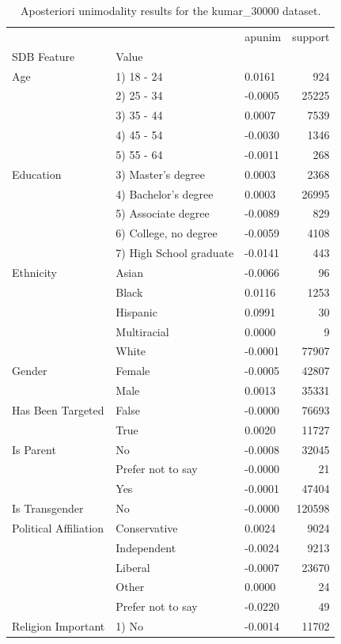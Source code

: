 \begin{table}[ht]\centering
\caption{Aposteriori unimodality results for the kumar_30000 dataset.}
\label{tab:kumar_30000}
\begin{tabular}{lllr}
\toprule
 &  & apunim & support \\
SDB Feature & Value &  &  \\
\midrule
Age & 1) 18 - 24 & 0.0161 & 924 \\
 & 2) 25 - 34 & -0.0005 & 25225 \\
 & 3) 35 - 44 & 0.0007 & 7539 \\
 & 4) 45 - 54 & -0.0030 & 1346 \\
 & 5) 55 - 64 & -0.0011 & 268 \\
Education & 3) Master's degree & 0.0003 & 2368 \\
 & 4) Bachelor's degree & 0.0003 & 26995 \\
 & 5) Associate degree & -0.0089 & 829 \\
 & 6) College, no degree & -0.0059 & 4108 \\
 & 7) High School graduate & -0.0141 & 443 \\
Ethnicity & Asian & -0.0066 & 96 \\
 & Black & 0.0116 & 1253 \\
 & Hispanic & 0.0991 & 30 \\
 & Multiracial & 0.0000 & 9 \\
 & White & -0.0001 & 77907 \\
Gender & Female & -0.0005 & 42807 \\
 & Male & 0.0013 & 35331 \\
Has Been Targeted & False & -0.0000 & 76693 \\
 & True & 0.0020 & 11727 \\
Is Parent & No & -0.0008 & 32045 \\
 & Prefer not to say & -0.0000 & 21 \\
 & Yes & -0.0001 & 47404 \\
Is Transgender & No & -0.0000 & 120598 \\
Political Affiliation & Conservative & 0.0024 & 9024 \\
 & Independent & -0.0024 & 9213 \\
 & Liberal & -0.0007 & 23670 \\
 & Other & 0.0000 & 24 \\
 & Prefer not to say & -0.0220 & 49 \\
Religion Important & 1) No & -0.0014 & 11702 \\

\end{tabular}
\end{table}
